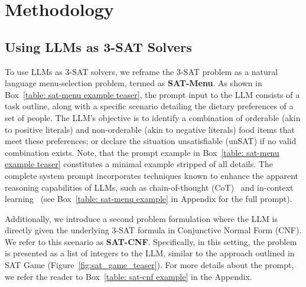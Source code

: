 \documentclass{article} %
\begin{document}
\section{Methodology}
\subsection{Using LLMs as 3-SAT Solvers}
\label{section: llms as 3-sat solvers}

To use LLMs as 3-SAT solvers, we reframe the 3-SAT problem as a natural language menu-selection problem, termed as \textbf{SAT-Menu}. As shown in Box~\ref{table: sat-menu example teaser}, the prompt input to the LLM consists of a task outline, along with a specific scenario detailing the dietary preferences of a set of people. The LLM's objective is to identify a combination of orderable (akin to positive literals) and non-orderable (akin to negative literals) food items that meet these preferences; or declare the situation unsatisfiable (unSAT) if no valid combination exists. Note, that the prompt example in Box~\ref{table: sat-menu example teaser} constitutes a minimal example stripped of all details. The complete system prompt incorporates techniques known to enhance the apparent reasoning capabilities of LLMs, such as chain-of-thought (CoT)~\citep{chain_of_thought} and in-context learning~\citep{llms_few_shot_learners} (see Box~\ref{table: sat-menu example} in Appendix for the full prompt).

Additionally, we introduce a second problem formulation where the LLM is directly given the underlying 3-SAT formula in Conjunctive Normal Form (CNF). We refer to this scenario as \textbf{SAT-CNF}. Specifically, in this setting, the problem is presented as a list of integers to the LLM, similar to the approach outlined in SAT Game (Figure~\ref{fig:sat_game_teaser}).
For more details about the prompt, we refer the reader to Box~\ref{table: sat-cnf example} in the Appendix.
\end{document}
